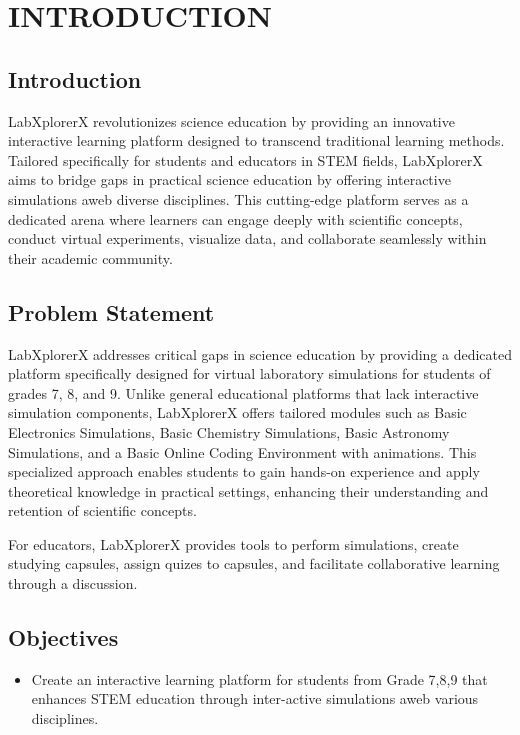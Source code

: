 \chapter{INTRODUCTION}



\section{Introduction}
LabXplorerX revolutionizes science education by providing an innovative interactive learning platform designed to transcend traditional learning methods. Tailored specifically for students and educators in STEM fields, LabXplorerX aims to bridge gaps in practical science education by offering interactive simulations aweb diverse disciplines. This cutting-edge platform serves as a dedicated arena where learners can engage deeply with scientific concepts, conduct virtual experiments, visualize data, and collaborate seamlessly within their academic community.


\section{Problem Statement }
LabXplorerX addresses critical gaps in science education by providing a dedicated platform specifically designed for virtual laboratory simulations for students of grades 7, 8, and 9. Unlike general educational platforms that lack interactive simulation components, LabXplorerX offers tailored modules such as Basic Electronics Simulations, Basic Chemistry Simulations, Basic Astronomy Simulations, and a Basic Online Coding Environment with animations. This specialized approach enables students to gain hands-on experience and apply theoretical knowledge in practical settings, enhancing their understanding and retention of scientific concepts.

For educators, LabXplorerX provides tools to perform simulations, create studying capsules, assign quizes to capsules, and facilitate collaborative learning through a discussion. 
\section{Objectives}
\begin{itemize}
    \item Create an interactive learning platform for students from Grade 7,8,9 that enhances STEM education through inter-active simulations aweb various disciplines.

\end{itemize}
